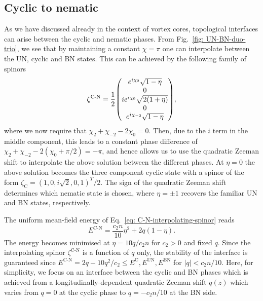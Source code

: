 \subsection{Cyclic to nematic}
As we have discussed already in the context of vortex cores, topological
interfaces can arise between the cyclic and nematic phases.
From Fig.~\ref{fig: UN-BN-duo-trio}, we see that by maintaining a constant
\(\chi=\pi \) one can interpolate between the UN, cyclic and BN states.
This can be achieved by the following family of spinors
\begin{align}\label{eq: C-N-interpolating-spinor}
    \zeta^\text{C-N} = \frac{1}{2}\mqty(
    e^{i\chi_2}\sqrt{1 - \eta} \\
    0 \\
    ie^{i\chi_0}\sqrt{2(1+\eta)} \\
    0 \\
    e^{i\chi_{-2}}\sqrt{1 - \eta}
    ),
\end{align}
where we now require that \(\chi_2 + \chi_{-2} - 2\chi_0 = 0\).
Then, due to the \(i\) term in the middle component, this leads to a constant
phase difference of \(\chi_2 + \chi_{-2} - 2(\chi_0 + \pi/2) = -\pi \), and
hence allows us to use the quadratic Zeeman shift to interpolate the above
solution between the different phases.
At \(\eta = 0\) the above solution becomes the three component cyclic state with
a spinor of the form \(\zeta_\mathrm{C} = {(1, 0, i\sqrt{2}, 0, 1)}^T/2\).
The sign of the quadratic Zeeman shift determines which nematic state is chosen,
where \(\eta = \pm 1\) recovers the familiar UN and BN states, respectively.

The uniform mean-field energy of Eq.~\eqref{eq: C-N-interpolating-spinor} reads
\begin{equation}
    E^\text{C-N} = \frac{c_2n}{10}\eta^2 + 2q(1 - \eta).
\end{equation}
The energy becomes minimised at \(\eta = 10q/c_2n\) for \(c_2 > 0\) and fixed
\(q\).
Since the interpolating spinor \(\zeta^\text{C-N}\) is a function of \(q\) only,
the stability of the interface is guaranteed since \(E^\text{C-N} =
2q-10q^2/c_2 \leq E^\text{C}, E^\text{UN},
E^\text{BN}\) for \(|q| < c_2n/10\).
Here, for simplicity, we focus on an interface between the cyclic and BN phases
which is achieved from a longitudinally-dependent quadratic Zeeman shift
\(q(z)\) which varies from \(q = 0\) at the cyclic phase to \(q = -c_2n/10\)
at the BN side.

